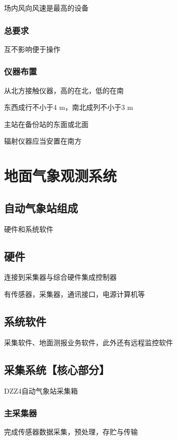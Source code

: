 ﻿\documentclass[UTF8,11pt]{ctexbook}%
\begin{document}
场内风向风速是最高的设备

\subsubsection{总要求}

互不影响便于操作

\subsubsection{仪器布置}

从北方接触仪器，高的在北，低的在南

东西成行不小于4 m，南北成列不小于3 m

主站在备份站的东面或北面

辐射仪器应当安置在南方

\section{地面气象观测系统}

\subsection{自动气象站组成}

硬件和系统软件

\subsection{硬件}

连接到采集器与综合硬件集成控制器

有传感器，采集器，通讯接口，电源计算机等

\subsection{系统软件}

采集软件、地面测报业务软件，此外还有远程监控软件

\subsection{采集系统【核心部分】}

DZZ4自动气象站采集箱

\subsubsection{主采集器}

完成传感器数据采集，预处理，存贮与传输
\end{document}

